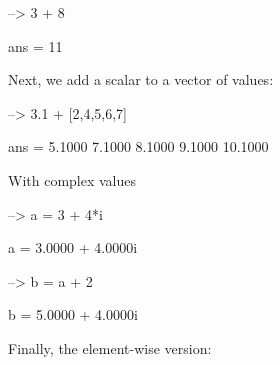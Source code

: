 \begin{DoxyVerbInclude}
--> 3 + 8

ans = 
 11 
\end{DoxyVerbInclude}


Next, we add a scalar to a vector of values\-:


\begin{DoxyVerbInclude}
--> 3.1 + [2,4,5,6,7]

ans = 
    5.1000    7.1000    8.1000    9.1000   10.1000 
\end{DoxyVerbInclude}


With complex values


\begin{DoxyVerbInclude}
--> a = 3 + 4*i

a = 
   3.0000 +  4.0000i 

--> b = a + 2

b = 
   5.0000 +  4.0000i 
\end{DoxyVerbInclude}


Finally, the element-\/wise version\-:


